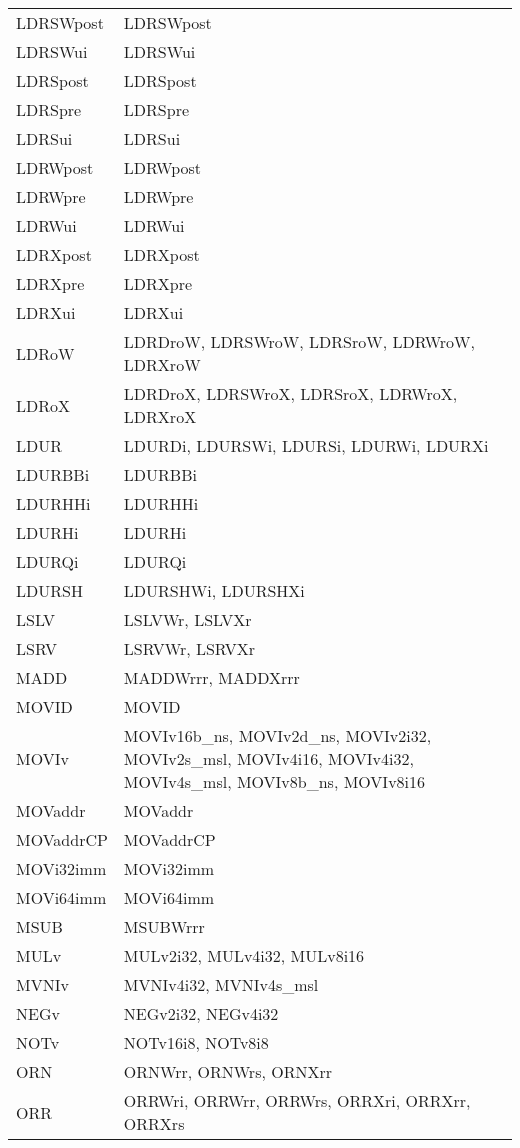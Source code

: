 \begin{xltabular}{\textwidth}{lX}
    LDRSWpost & LDRSWpost \\
    LDRSWui & LDRSWui \\
    LDRSpost & LDRSpost \\
    LDRSpre & LDRSpre \\
    LDRSui & LDRSui \\
    LDRWpost & LDRWpost \\
    LDRWpre & LDRWpre \\
    LDRWui & LDRWui \\
    LDRXpost & LDRXpost \\
    LDRXpre & LDRXpre \\
    LDRXui & LDRXui \\
    LDRoW & LDRDroW, LDRSWroW, LDRSroW, LDRWroW, LDRXroW \\
    LDRoX & LDRDroX, LDRSWroX, LDRSroX, LDRWroX, LDRXroX \\
    LDUR & LDURDi, LDURSWi, LDURSi, LDURWi, LDURXi \\
    LDURBBi & LDURBBi \\
    LDURHHi & LDURHHi \\
    LDURHi & LDURHi \\
    LDURQi & LDURQi \\
    LDURSH & LDURSHWi, LDURSHXi \\
    LSLV & LSLVWr, LSLVXr \\
    LSRV & LSRVWr, LSRVXr \\
    MADD & MADDWrrr, MADDXrrr \\
    MOVID & MOVID \\
    MOVIv & MOVIv16b\_ns, MOVIv2d\_ns, MOVIv2i32, MOVIv2s\_msl, MOVIv4i16, MOVIv4i32, MOVIv4s\_msl, MOVIv8b\_ns, MOVIv8i16 \\
    MOVaddr & MOVaddr \\
    MOVaddrCP & MOVaddrCP \\
    MOVi32imm & MOVi32imm \\
    MOVi64imm & MOVi64imm \\
    MSUB & MSUBWrrr \\
    MULv & MULv2i32, MULv4i32, MULv8i16 \\
    MVNIv & MVNIv4i32, MVNIv4s\_msl \\
    NEGv & NEGv2i32, NEGv4i32 \\
    NOTv & NOTv16i8, NOTv8i8 \\
    ORN & ORNWrr, ORNWrs, ORNXrr \\
    ORR & ORRWri, ORRWrr, ORRWrs, ORRXri, ORRXrr, ORRXrs \\

\end{xltabular}
